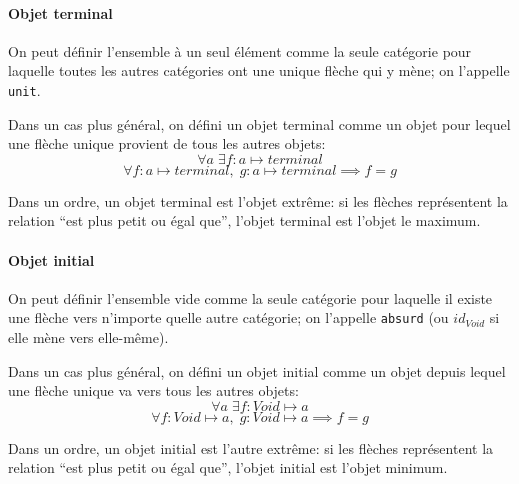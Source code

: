 \documentclass[a4paper,10pt,french,openany]{memoir}
\begin{document}
\paragraph{Objet terminal}
On peut définir l'ensemble à un seul élément comme la seule catégorie pour laquelle toutes les autres catégories ont une unique flèche qui y mène; on l'appelle \lstinline{unit}.

Dans un cas plus général, on défini un objet terminal comme un objet pour lequel une flèche unique provient de tous les autres objets:
\[ \forall a \; \exists f : a \mapsto terminal \]
\[ \forall f : a \mapsto terminal,\; g : a \mapsto terminal \implies f = g \]

Dans un ordre, un objet terminal est l'objet extrême: si les flèches représentent la relation ``est plus petit ou égal que'', l'objet terminal est l'objet le maximum.

\paragraph{Objet initial}
On peut définir l'ensemble vide comme la seule catégorie pour laquelle il existe une flèche vers n'importe quelle autre catégorie; on l'appelle \lstinline{absurd} (ou $id_{Void}$ si elle mène vers elle-même).

Dans un cas plus général, on défini un objet initial comme un objet depuis lequel une flèche unique va vers tous les autres objets:
\[ \forall a \; \exists f : Void \mapsto a \]
\[ \forall f : Void \mapsto a,\; g : Void \mapsto a \implies f = g \]

Dans un ordre, un objet initial est l'autre extrême: si les flèches représentent la relation ``est plus petit ou égal que'', l'objet initial est l'objet minimum.

\printindex
\end{document}
